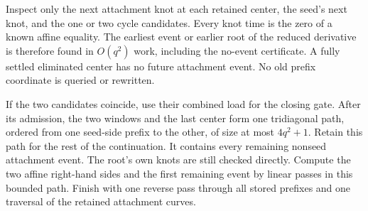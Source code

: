 Inspect only the next attachment knot at each retained center, the seed's
next knot, and the one or two cycle candidates. Every knot time is the
zero of a known affine equality. The earliest event or earlier root of
the reduced derivative is therefore found in $O(q^2)$ work, including
the no-event certificate. A fully settled eliminated center has no future
attachment event. No old prefix coordinate is queried or rewritten.

If the two candidates coincide, use their combined load for the closing
gate. After its admission, the two windows and the last center form one
tridiagonal path, ordered from one seed-side prefix to the other, of size
at most $4q^2+1$. Retain this path for the rest of the continuation.
It contains every remaining nonseed attachment event. The root's own
knots are still checked directly. Compute the two affine right-hand sides
and the first remaining event by linear passes in this bounded path.
Finish with one reverse pass through all stored prefixes and one traversal
of the retained attachment curves.

